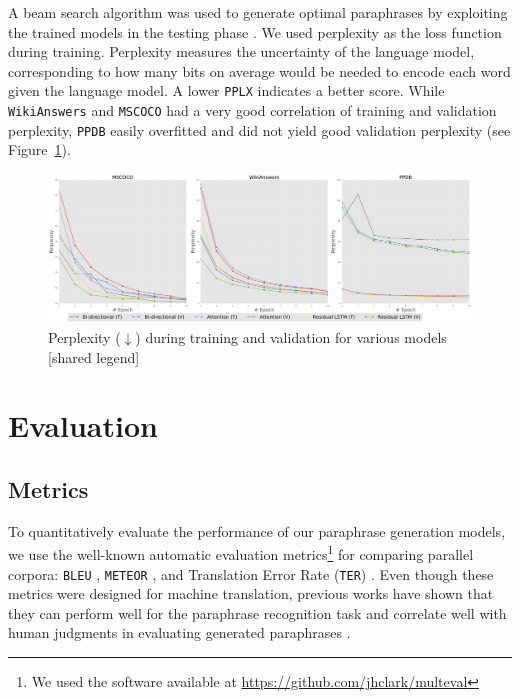 A beam search algorithm was used to generate optimal paraphrases by exploiting the trained models in the testing phase \cite{SutskeverVL14}. We used perplexity as the loss function during training. Perplexity measures the uncertainty of the language model, corresponding to how many bits on average would be needed to encode each word given the language model. A lower \texttt{PPLX} indicates a better score. While \texttt{WikiAnswers} and \texttt{MSCOCO} had a very good correlation of training and validation perplexity, \texttt{PPDB} easily overfitted and did not yield good validation perplexity (see Figure~\ref{fig:perplex}).
\begin{figure}
    \centering
    \includegraphics[scale=0.25]{figures/paraphrase/plots.pdf}
    \caption[Model Evaluation]{Perplexity ($\downarrow$) during training and validation for various models [shared legend]}
    \label{fig:perplex}
\end{figure}
\section{Evaluation}
\subsection{Metrics}
To quantitatively evaluate the performance of our paraphrase generation models, we use the well-known automatic evaluation metrics\footnote{We used the software available at \url{https://github.com/jhclark/multeval}} for comparing parallel corpora:
\texttt{BLEU} \cite{papineni2002}, \texttt{METEOR}  \cite{Lavie2007}, and Translation Error Rate (\texttt{TER}) \cite{snover2006study}. Even though these metrics were designed for machine translation, previous works have shown that they can perform well for the paraphrase recognition task \cite{Madnani2012} and correlate well with human judgments in evaluating generated paraphrases \cite{Wubben2010}.
 
